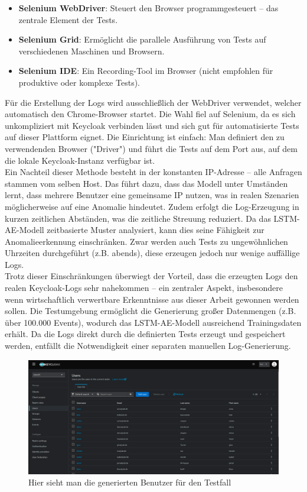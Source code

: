 \documentclass[a4paper,12pt]{article}
\begin{document}
	\begin{itemize}
		\item \textbf{Selenium WebDriver}: Steuert den Browser programmgesteuert – das zentrale Element der Tests.
		\item \textbf{Selenium Grid}: Ermöglicht die parallele Ausführung von Tests auf verschiedenen Maschinen und Browsern.
		\item \textbf{Selenium IDE}: Ein Recording-Tool im Browser (nicht empfohlen für produktive oder komplexe Tests).
	\end{itemize}
	
	Für die Erstellung der Logs wird ausschließlich der WebDriver verwendet, welcher automatisch den Chrome-Browser startet. Die Wahl fiel auf Selenium, da es sich unkompliziert mit Keycloak verbinden lässt und sich gut für automatisierte Tests auf dieser Plattform eignet. Die Einrichtung ist einfach: Man definiert den zu verwendenden Browser ("Driver") und führt die Tests auf dem Port aus, auf dem die lokale Keycloak-Instanz verfügbar ist.
	\\[0.5em]
	Ein Nachteil dieser Methode besteht in der konstanten IP-Adresse – alle Anfragen stammen vom selben Host. Das führt dazu, dass das Modell unter Umständen lernt, dass mehrere Benutzer eine gemeinsame IP nutzen, was in realen Szenarien möglicherweise auf eine Anomalie hindeutet. Zudem erfolgt die Log-Erzeugung in kurzen zeitlichen Abständen, was die zeitliche Streuung reduziert. Da das LSTM-AE-Modell zeitbasierte Muster analysiert, kann dies seine Fähigkeit zur Anomalieerkennung einschränken. Zwar werden auch Tests zu ungewöhnlichen Uhrzeiten durchgeführt (z.B. abends), diese erzeugen jedoch nur wenige auffällige Logs.
	\\[0.5em]
	Trotz dieser Einschränkungen überwiegt der Vorteil, dass die erzeugten Logs den realen Keycloak-Logs sehr nahekommen – ein zentraler Aspekt, insbesondere wenn wirtschaftlich verwertbare Erkenntnisse aus dieser Arbeit gewonnen werden sollen. Die Testumgebung ermöglicht die Generierung großer Datenmengen (z.B. über 100.000 Events), wodurch das LSTM-AE-Modell ausreichend Trainingsdaten erhält. Da die Logs direkt durch die definierten Tests erzeugt und gespeichert werden, entfällt die Notwendigkeit einer separaten manuellen Log-Generierung.
	
	\begin{figure}[H]
		\centering
		\includegraphics[scale=1.5, width=\linewidth]{screenshot011}
		\caption{Hier sieht man die generierten Benutzer für den Testfall}
		\label{fig:screenshot011}
	\end{figure}
	
\end{document}
